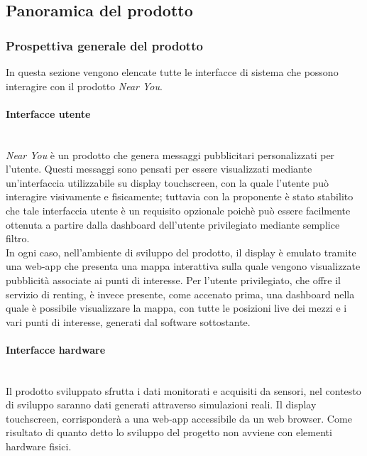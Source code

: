 \documentclass[11pt]{article}
\begin{document}
\begin{justify}
\subsection{Panoramica del prodotto}
\subsubsection{Prospettiva generale del prodotto} 
In questa sezione vengono elencate tutte le interfacce di sistema che possono interagire con il prodotto 
\textit{Near You}.

\paragraph{Interfacce utente}\mbox{}\\
\textit{Near You} è un prodotto che genera messaggi pubblicitari personalizzati per l'utente. Questi messaggi sono 
pensati per essere visualizzati mediante un'interfaccia utilizzabile su display touchscreen, con la quale l'utente 
può interagire visivamente e fisicamente; tuttavia con la proponente è stato stabilito che tale interfaccia utente 
è un requisito opzionale poichè può essere facilmente ottenuta a partire dalla dashboard dell'utente privilegiato 
mediante semplice filtro. \\
In ogni caso, nell'ambiente di sviluppo del prodotto, il display è emulato tramite una web-app che presenta 
una mappa interattiva sulla quale vengono visualizzate pubblicità associate ai punti di interesse. Per l'utente 
privilegiato, che offre il servizio di renting, è invece presente, come accenato prima, una dashboard 
nella quale è possibile visualizzare la mappa, con tutte le posizioni live dei mezzi e i vari punti di interesse, 
generati dal software sottostante.
\paragraph{Interfacce hardware}\mbox{}\\
Il prodotto sviluppato sfrutta i dati monitorati e acquisiti da sensori, nel contesto di sviluppo saranno dati 
generati attraverso simulazioni reali. Il display touchscreen, corrisponderà a una web-app accessibile da un web 
browser. Come risultato di quanto detto lo sviluppo del progetto non avviene con elementi hardware fisici.


\end{justify}
\end{document}
